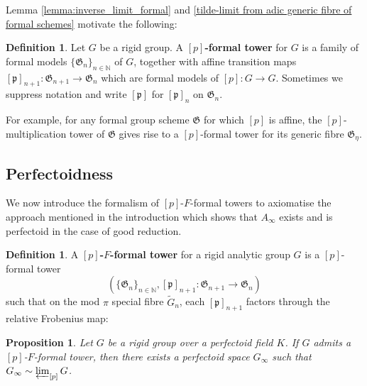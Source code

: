 \documentclass[10pt,oneside]{amsart}
\newtheorem{proposition}[theorem]{Proposition}
\theoremstyle{definition}
\newtheorem{definition}[theorem]{Definition}
\begin{document}
	Lemma \ref{lemma:inverse_limit_formal} and  \ref{tilde-limit from adic generic fibre of formal schemes} motivate the following: 
	\begin{definition}
	Let $G$ be a rigid group. A \textbf{$[p]$-formal tower} for $G$ is  a family of formal models $\{\mathfrak G_n\}_{n\in \mathbb N}$ of $G$, together with affine transition maps $[\mathfrak p]_{n+1}:\mathfrak G_{n+1}\rightarrow \mathfrak G_{n}$ which are formal models of $[p]:G\rightarrow G$. Sometimes we suppress notation and write $[\mathfrak p]$ for $[\mathfrak p]_{n}$ on $\mathfrak G_n$. 
	\end{definition}
	For example, for any formal group scheme $\mathfrak G$ for which $[p]$ is affine, the $[p]$-multiplication tower of $\mathfrak G$ gives rise to a $[p]$-formal tower for its generic fibre $\mathfrak G_\eta$. 
	
	
	
	
	\subsection{Perfectoidness}  \label{subsection:perfectoid_tilde_limit}

We now introduce the formalism of $[p]$-$F$-formal towers to axiomatise the approach mentioned in the introduction which shows that $A_\infty$ exists and is perfectoid in the case of good reduction.
	
	\begin{definition}
		A \textbf{$[p]$-$F$-formal tower} for a rigid analytic group $G$ is a $[p]$-formal tower 
		$$(\{\mathfrak G_n\}_{n\in \mathbb N}, [\mathfrak p]_{n+1}:\mathfrak G_{n+1}\rightarrow \mathfrak G_{n})$$ such that on the mod $\pi$ special fibre  $\tilde{G}_n$, each   $[\mathfrak p]_{n+1}$ factors through the relative Frobenius map:
				\begin{center}
				\end{center}
	 
	\end{definition}	
	
	 	\begin{proposition}\label{existence of p-F-formal tower implies perfectoid}
		Let $G$ be a rigid group over a perfectoid field $K$. If $G$ admits a $[p]$-$F$-formal tower, then there exists a perfectoid space $G_\infty$ such that $G_\infty \sim \varprojlim_{[p]}G$.
	\end{proposition}
\end{document}
